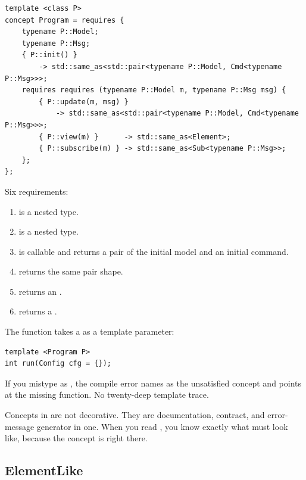\begin{lstlisting}
template <class P>
concept Program = requires {
    typename P::Model;
    typename P::Msg;
    { P::init() }
        -> std::same_as<std::pair<typename P::Model, Cmd<typename P::Msg>>>;
    requires requires (typename P::Model m, typename P::Msg msg) {
        { P::update(m, msg) }
            -> std::same_as<std::pair<typename P::Model, Cmd<typename P::Msg>>>;
        { P::view(m) }      -> std::same_as<Element>;
        { P::subscribe(m) } -> std::same_as<Sub<typename P::Msg>>;
    };
};
\end{lstlisting}

Six requirements:

\begin{enumerate}[leftmargin=*]
  \item {} is a nested type.
  \item {} is a nested type.
  \item {} is callable and returns a pair of the
    initial model and an initial command.
  \item {} returns the same pair shape.
  \item {} returns an .
  \item {} returns a .
\end{enumerate}

The  function takes a  as a template
parameter:

\begin{lstlisting}
template <Program P>
int run(Config cfg = {});
\end{lstlisting}

If you mistype  as , the compile error names
 as the unsatisfied concept and points at the
missing function. No twenty-deep template trace.

\begin{idea}
Concepts in \maya{} are not decorative. They are documentation,
contract, and error-message generator in one. When you read
, you know exactly what 
must look like, because the concept is right there.
\end{idea}

\subsection*{ElementLike}

